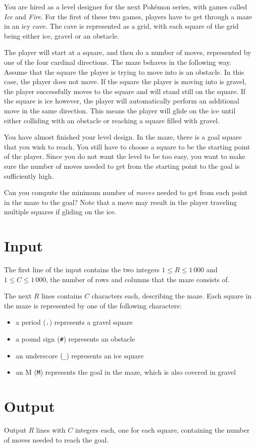 You are hired as a level designer for the next Pokémon series, with games called \emph{Ice} and \emph{Fire}.
For the first of these two games, players have to get through a maze in an icy cave.
The cave is represented as a grid, with each square of the grid being either ice, gravel or an obstacle.

The player will start at a square, and then do a number of moves, represented by one of the four cardinal directions.
The maze behaves in the following way.
Assume that the square the player is trying to move into is an obstacle.
In this case, the player does not move.
If the square the player is moving into is gravel, the player successfully moves to the square and will stand still on the square.
If the square is ice however, the player will automatically perform an additional move in the same direction.
This means the player will glide on the ice until either colliding with an obstacle or reaching a square filled with gravel.

You have almost finished your level design.
In the maze, there is a goal square that you wish to reach.
You still have to choose a square to be the starting point of the player.
Since you do not want the level to be too easy, you want to make sure the number of moves needed to get from the starting point to the goal is sufficiently high.

Can you compute the minimum number of \emph{moves} needed to get from each point in the maze to the goal?
Note that a move may result in the player traveling multiple squares if gliding on the ice.

\section*{Input}
The first line of the input contains the two integers $1 \le R \le 1\,000$ and $1 \le C \le 1\,000$, the number of rows and columns that the maze consists of.

The next $R$ lines contains $C$ characters each, describing the maze.
Each square in the maze is represented by one of the following characters:
\begin{itemize}
\item a period (\texttt{.}) represents a gravel square
\item a pound sign (\texttt{#}) represents an obstacle
\item an underscore (\texttt{_}) represents an ice square
\item an M (\texttt{M}) represents the goal in the maze, which is also covered in gravel
\end{itemize}


\section*{Output}
Output $R$ lines with $C$ integers each, one for each square, containing the number of moves needed to reach the goal.
